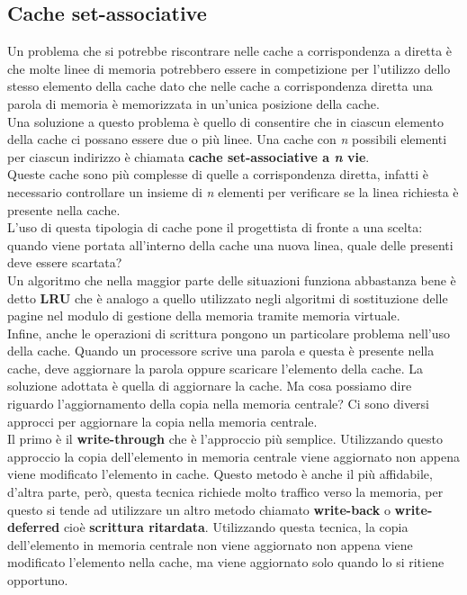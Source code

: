 \documentclass[12pt]{report}
\begin{document}
\subsection{Cache set-associative}
Un problema che si potrebbe riscontrare nelle cache a corrispondenza a diretta è che molte linee di memoria potrebbero essere in competizione per l'utilizzo dello stesso elemento della cache dato che nelle cache a corrispondenza diretta una parola di memoria è memorizzata in un'unica posizione della cache. \\
Una soluzione a questo problema è quello di consentire che in ciascun elemento della cache ci possano essere due o più linee. Una cache con \textit{n} possibili elementi per ciascun indirizzo è chiamata \textbf{cache set-associative a \textit{n} vie}. \\
Queste cache sono più complesse di quelle a corrispondenza diretta, infatti è necessario controllare un insieme di \textit{n} elementi per verificare se la linea richiesta è presente nella cache. \\
L'uso di questa tipologia di cache pone il progettista di fronte a una scelta: quando viene portata all'interno della cache una nuova linea, quale delle presenti deve essere scartata? \\
Un algoritmo che nella maggior parte delle situazioni funziona abbastanza bene è detto \textbf{LRU} che è analogo a quello utilizzato negli algoritmi di sostituzione delle pagine nel modulo di gestione della memoria tramite memoria virtuale. \\
Infine, anche le operazioni di scrittura pongono un particolare problema nell'uso della cache. Quando un processore scrive una parola e questa è presente nella cache, deve aggiornare la parola oppure scaricare l'elemento della cache. La soluzione adottata è quella di aggiornare la cache. Ma cosa possiamo dire riguardo l'aggiornamento della copia nella memoria centrale? Ci sono diversi approcci per aggiornare la copia nella memoria centrale. \\
Il primo è il \textbf{write-through} che è l'approccio più semplice. Utilizzando questo approccio la copia dell'elemento in memoria centrale viene aggiornato non appena viene modificato l'elemento in cache. Questo metodo è anche il più affidabile, d'altra parte, però, questa tecnica richiede molto traffico verso la memoria, per questo si tende ad utilizzare un altro metodo chiamato \textbf{write-back} o \textbf{write-deferred} cioè \textbf{scrittura ritardata}. Utilizzando questa tecnica, la copia dell'elemento in memoria centrale non viene aggiornato non appena viene modificato l'elemento nella cache, ma viene aggiornato solo quando lo si ritiene opportuno. \\
\end{document}
